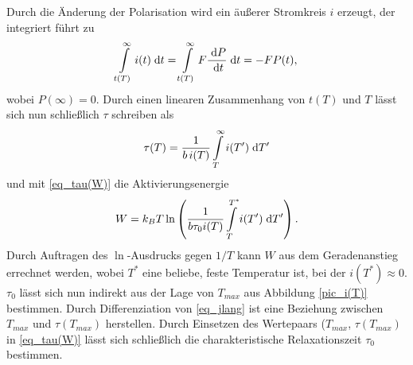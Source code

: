 Durch die Änderung der Polarisation wird ein äußerer Stromkreis $i$ erzeugt, der integriert führt zu
\begin{align}
 \int\limits_{t(T)}^\infty i(t)\; \mathrm{d} t = \int\limits_{t(T)}^\infty F\frac{\; \mathrm{d} P}{\; \mathrm{d} t}\; \mathrm{d} t = -FP(t),
\end{align}
wobei $P(\infty) = 0$. Durch einen linearen Zusammenhang von $t(T)$ und $T$ lässt sich nun schließlich $\tau$ schreiben als
\begin{align}
 \tau(T) = \frac{1}{b\,i(T)}\int\limits_T^\infty i(T')\; \mathrm{d} T'
\end{align}
und mit \eqref{eq_tau(W)} die Aktivierungsenergie
\begin{align}
 W = k_BT \ln\left(\frac{1}{b\tau_0 i(T)}\int\limits_T^{T^*} i(T')\; \mathrm{d} T'\right).
 \label{eq_int}
\end{align}
Durch Auftragen des $\ln$-Ausdrucks gegen $1/T$ kann $W$ aus dem Geradenanstieg errechnet werden, wobei $T^*$ eine beliebe, feste Temperatur ist,
bei der $i(T^*)\approx 0$. $\tau_0$ lässt sich nun indirekt aus der Lage von $T_{max}$ aus Abbildung \ref{pic_i(T)} bestimmen. Durch Differenziation
von \eqref{eq_jlang} ist eine Beziehung zwischen $T_{max}$ und $\tau(T_{max})$ herstellen. Durch Einsetzen des Wertepaars ($T_{max}$, $\tau(T_{max})$
in \eqref{eq_tau(W)} lässt sich schließlich die charakteristische Relaxationszeit $\tau_0$ bestimmen.

